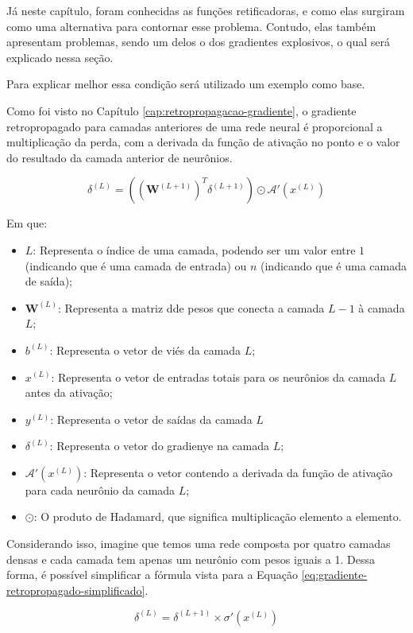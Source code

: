 Já neste capítulo, foram conhecidas as funções retificadoras, e como elas surgiram como uma alternativa para contornar esse problema. Contudo, elas também apresentam problemas, sendo um delos o dos gradientes explosivos, o qual será explicado nessa seção.

Para explicar melhor essa condição será utilizado um exemplo como base.

Como foi visto no Capítulo \ref{cap:retropropagacao-gradiente}, o gradiente retropropagado para camadas anteriores de uma rede neural é proporcional a multiplicação da perda, com a derivada da função de ativação no ponto e o valor do resultado da camada anterior de neurônios. 

\[
    \delta^{(L)} = \left( \left( \textbf{W}^{(L+1)} \right)^T \delta^{(L+1)} \right)  \odot \mathcal{A}'(x^{(L)})
\]

Em que: 

\begin{itemize}
    \item $L$: Representa o índice de uma camada, podendo ser um valor entre $1$ (indicando que é uma camada de entrada) ou $n$ (indicando que é uma camada de saída);
    \item $\textbf{W}^{(L)}$: Representa a matriz dde pesos que conecta a camada $L - 1$ à camada $L$;
    \item $b^{(L)}$: Representa o vetor de viés da camada $L$;
    \item $x^{(L)}$: Representa o vetor de entradas totais para os neurônios da camada $L$ antes da ativação;
    \item $y^{(L)}$: Representa o vetor de saídas da camada $L$
    \item $\delta^{(L)}$: Representa o vetor do gradienye na camada $L$;
    \item $\mathcal{A}'(x^{(L)})$: Representa o vetor contendo a derivada da função de ativação para cada neurônio da camada $L$;
    \item $\odot$: O produto de Hadamard, que significa multiplicação elemento a elemento.
\end{itemize}

Considerando isso, imagine que temos uma rede composta por quatro camadas densas e cada camada tem apenas um neurônio com pesos iguais a 1. Dessa forma, é possível simplificar a fórmula vista para a Equação \ref{eq:gradiente-retropropagado-simplificado}.

\begin{equation}
        \delta^{(L)} =  \delta^{(L+1)} \times \sigma'(x^{(L)})
        \label{eq:gradiente-retropropagado-simplificado}
\end{equation}

